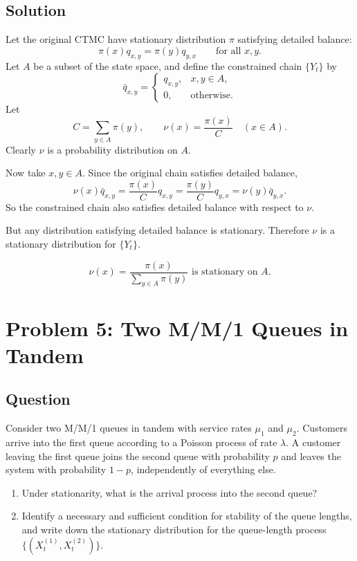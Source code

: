 \documentclass[11pt,a4paper]{article}
\newcommand{\1}{\mathbf{1}}
\begin{document}
\subsection*{Solution}
Let the original CTMC have stationary distribution $\pi$ satisfying detailed balance:
\[
\pi(x)q_{x,y}=\pi(y)q_{y,x}\qquad \text{for all }x,y.
\]
Let $A$ be a subset of the state space, and define the constrained chain $\{Y_t\}$ by
\[
\bar q_{x,y}=
\begin{cases}
q_{x,y}, & x,y\in A,\\
0, & \text{otherwise.}
\end{cases}
\]
Let
\[
C=\sum_{y\in A}\pi(y),\qquad \nu(x)=\frac{\pi(x)}{C}\quad (x\in A).
\]
Clearly $\nu$ is a probability distribution on $A$.

Now take $x,y\in A$. Since the original chain satisfies detailed balance,
\[
\nu(x)\bar q_{x,y}
=\frac{\pi(x)}{C}q_{x,y}
=\frac{\pi(y)}{C}q_{y,x}
=\nu(y)\bar q_{y,x}.
\]
So the constrained chain also satisfies detailed balance with respect to $\nu$.

But any distribution satisfying detailed balance is stationary. Therefore $\nu$ is a stationary distribution for $\{Y_t\}$.

\[
\boxed{\nu(x)=\frac{\pi(x)}{\sum_{y\in A}\pi(y)}\text{ is stationary on }A.}
\]

\section{Problem 5: Two M/M/1 Queues in Tandem}
\subsection*{Question}
Consider two M/M/1 queues in tandem with service rates $\mu_1$ and $\mu_2$. Customers arrive into the first queue according to a Poisson process of rate $\lambda$. A customer leaving the first queue joins the second queue with probability $p$ and leaves the system with probability $1-p$, independently of everything else.

\begin{enumerate}[label=\textbf{(\alph*)}]
  \item Under stationarity, what is the arrival process into the second queue?
  \item Identify a necessary and sufficient condition for stability of the queue lengths, and write down the stationary distribution for the queue-length process $\{(X_t^{(1)},X_t^{(2)})\}$.
\end{enumerate}
\end{document}
